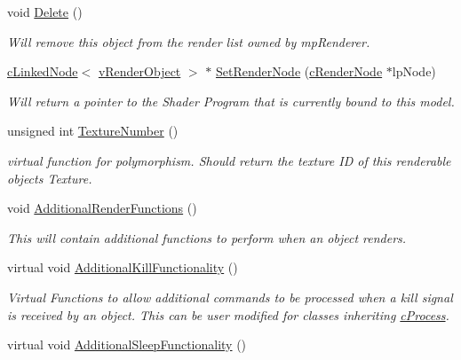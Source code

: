 \begin{DoxyCompactItemize}
void \hyperlink{classc_render_object_a7f1424d2badbe9e09bc6fd4af6616fa0}{Delete} ()
\begin{DoxyCompactList}\small\item\em Will remove this object from the render list owned by mpRenderer. \item\end{DoxyCompactList}\item 
\hyperlink{classc_linked_node}{cLinkedNode}$<$ \hyperlink{classv_render_object}{vRenderObject} $>$ $\ast$ \hyperlink{classc_render_object_ac89f6defa0ff8b5834f80055a6723346}{SetRenderNode} (\hyperlink{classc_render_node}{cRenderNode} $\ast$lpNode)
\begin{DoxyCompactList}\small\item\em Will return a pointer to the Shader Program that is currently bound to this model. \item\end{DoxyCompactList}\item 
unsigned int \hyperlink{classc_render_object_ad2c6096f2e9d99e19d1ca89814567f6e}{TextureNumber} ()
\begin{DoxyCompactList}\small\item\em virtual function for polymorphism. Should return the texture ID of this renderable objects Texture. \item\end{DoxyCompactList}\item 
void \hyperlink{classc_render_object_a1a023520677b50e63fc2334717a2761d}{AdditionalRenderFunctions} ()
\begin{DoxyCompactList}\small\item\em This will contain additional functions to perform when an object renders. \item\end{DoxyCompactList}\item 
virtual void \hyperlink{classc_render_object_ae05caabd6783700f4ed50c8224690645}{AdditionalKillFunctionality} ()
\begin{DoxyCompactList}\small\item\em Virtual Functions to allow additional commands to be processed when a kill signal is received by an object. This can be user modified for classes inheriting \hyperlink{classc_process}{cProcess}. \item\end{DoxyCompactList}\item 
virtual void \hyperlink{classc_render_object_a86cedd6452174f7f091e0cdd0fcb3721}{AdditionalSleepFunctionality} ()

\end{DoxyCompactItemize}
